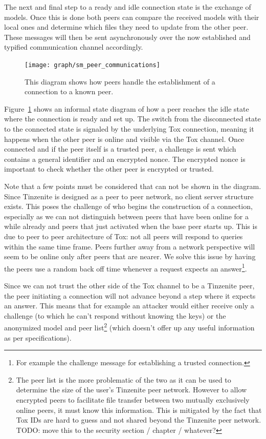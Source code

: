 The next and final step to a ready and idle connection state is the exchange of models.
Once this is done both peers can compare the received models with their local ones and determine which files they need to update from the other peer.
These messages will then be sent asynchronously over the now established and typified communication channel accordingly.

\begin{figure}[htp]
\centering
    \texttt{[image: graph/sm\_peer\_communications]}
\caption[Connection State Diagram]{This diagram shows how peers handle the establishment of a connection to a known peer.}
\label{graph:connection_states}
\end{figure}

Figure~\ref{graph:connection_states} shows an informal state diagram of how a peer reaches the idle state where the connection is ready and set up.
The switch from the disconnected state to the connected state is signaled by the underlying Tox connection, meaning it happens when the other peer is online and visible via the Tox channel.
Once connected and if the peer itself is a trusted peer, a challenge is sent which contains a general identifier and an encrypted nonce.
The encrypted nonce is important to check whether the other peer is encrypted or trusted.

Note that a few points must be considered that can not be shown in the diagram.
Since Tinzenite is designed as a peer to peer network, no client server structure exists.
This poses the challenge of who begins the construction of a connection, especially as we can not distinguish between peers that have been online for a while already and peers that just activated when the base peer starts up.
This is due to peer to peer architecture of Tox: not all peers will respond to queries within the same time frame.
Peers further away from a network perspective will seem to be online only after peers that are nearer.
We solve this issue by having the peers use a random back off time whenever a request expects an answer\footnote{For example the challenge message for establishing a trusted connection.}.

Since we can not trust the other side of the Tox channel to be a Tinzenite peer, the peer initiating a connection will not advance beyond a step where it expects an answer.
This means that for example an attacker would either receive only a challenge (to which he can't respond without knowing the keys) or the anonymized model and peer list\footnote{The peer list is the more problematic of the two as it can be used to determine the size of the user's Tinzenite peer network. However to allow encrypted peers to facilitate file transfer between two mutually exclusively online peers, it must know this information. This is mitigated by the fact that Tox IDs are hard to guess and not shared beyond the Tinzenite peer network. TODO: move this to the security section / chapter / whatever?} (which doesn't offer up any useful information as per specifications).

